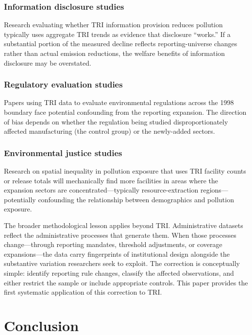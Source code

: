 \documentclass[12pt]{article}
\begin{document}
\subsubsection*{Information disclosure studies} Research evaluating whether TRI information provision reduces pollution \citep{hamilton1995pollution,konar1997does,khanna1998toxics} typically uses aggregate TRI trends as evidence that disclosure ``works.'' If a substantial portion of the measured decline reflects reporting-universe changes rather than actual emission reductions, the welfare benefits of information disclosure may be overstated.

\subsubsection*{Regulatory evaluation studies} Papers using TRI data to evaluate environmental regulations across the 1998 boundary \citep{greenstone2004did,chay2005does} face potential confounding from the reporting expansion. The direction of bias depends on whether the regulation being studied disproportionately affected manufacturing (the control group) or the newly-added sectors.

\subsubsection*{Environmental justice studies} Research on spatial inequality in pollution exposure \citep{banzhaf2008environmental,currie2015environmental} that uses TRI facility counts or release totals will mechanically find more facilities in areas where the expansion sectors are concentrated---typically resource-extraction regions---potentially confounding the relationship between demographics and pollution exposure.

The broader methodological lesson applies beyond TRI. Administrative datasets reflect the administrative processes that generate them. When those processes change---through reporting mandates, threshold adjustments, or coverage expansions---the data carry fingerprints of institutional design alongside the substantive variation researchers seek to exploit. The correction is conceptually simple: identify reporting rule changes, classify the affected observations, and either restrict the sample or include appropriate controls. This paper provides the first systematic application of this correction to TRI.

\section{Conclusion}
\end{document}
